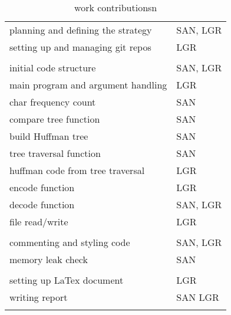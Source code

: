 \documentclass[a4paper,11pt,twoside]{article}
\begin{document}
\begin{table}[]
\centering
\caption{work contributionsn}
\label{tab:contribution}
\begin{tabular}{ll}
planning and defining the strategy & SAN, LGR \\
setting up and managing git repos  & LGR      \\
                                   &          \\
initial code structure             & SAN, LGR \\
main program and argument handling & LGR      \\
char frequency count               & SAN      \\
compare tree function              & SAN      \\
build Huffman tree                 & SAN      \\
tree traversal function            & SAN      \\
huffman code from tree traversal   & LGR      \\
encode function                    & LGR      \\
decode function                    & SAN, LGR \\
file read/write                    & LGR      \\
                                   &          \\
commenting and styling code        & SAN, LGR \\
memory leak check                  & SAN      \\
                                   &          \\
setting up LaTex document          & LGR      \\
writing report                     & SAN LGR  \\
                                   &         
\end{tabular}
\end{table}



\end{document}
